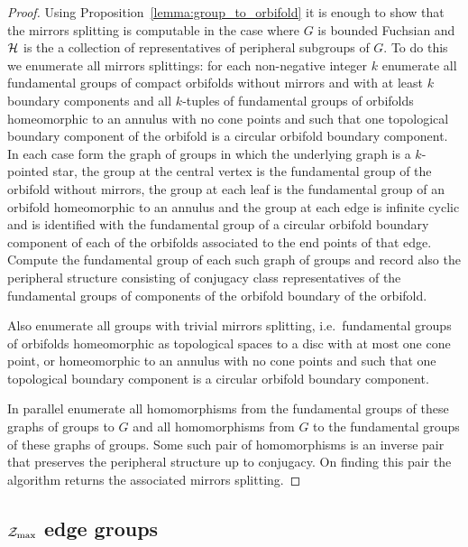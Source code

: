 \begin{proof}
Using Proposition~\ref{lemma:group_to_orbifold} it is enough to show that the mirrors splitting is computable in the case where $G$ is bounded Fuchsian and $\mathcal{H}$ is the a collection of representatives of peripheral subgroups of $G$. 
To do this we enumerate all mirrors splittings: for each non-negative integer $k$ enumerate all fundamental groups of compact orbifolds without mirrors and with at least $k$ boundary components and all $k$-tuples of fundamental groups of orbifolds homeomorphic to an annulus with no cone points and such that one topological boundary component of the orbifold is a circular orbifold boundary component. 
In each case form the graph of groups in which the underlying graph is a $k$-pointed star, the group at the central vertex is the fundamental group of the orbifold without mirrors, the group at each leaf is the fundamental group of an orbifold homeomorphic to an annulus and the group at each edge is infinite cyclic and is identified with the fundamental group of a circular orbifold boundary component of each of the orbifolds associated to the end points of that edge. 
Compute the fundamental group of each such graph of groups and record also the peripheral structure consisting of conjugacy class representatives of the fundamental groups of components of the orbifold boundary of the orbifold.  

Also enumerate all groups with trivial mirrors splitting, i.e.\ fundamental groups of orbifolds homeomorphic as topological spaces to a disc with at most one cone point, or homeomorphic to an annulus with no cone points and such that one topological boundary component is a circular orbifold boundary component.

In parallel enumerate all homomorphisms from the fundamental groups of these graphs of groups to $G$ and all homomorphisms from $G$ to the fundamental groups of these graphs of groups. 
Some such pair of homomorphisms is an inverse pair that preserves the peripheral structure up to conjugacy.  
On finding this pair the algorithm returns the associated mirrors splitting.
\end{proof}

\subsection{\texorpdfstring{$\mathcal{Z}_\text{max}$}{Zmax} edge groups}


